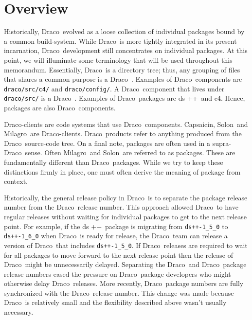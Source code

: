 \documentclass[11pt]{nmemo}
\newcommand{\draco}{{\normalfont\normalsize\sffamily Draco}}
\newcommand{\milagro}{{\normalfont\normalsize\sffamily Milagro}}
\newcommand{\solon}{{\normalfont\normalsize\sffamily Solon}}
\newcommand{\capsaicin}{{\normalfont\normalsize\sffamily Capsaicin}}
\newcommand{\cfour}{{\normalfont\normalsize\sffamily c\footnotesize 4}}
\newcommand{\dsxx}{{\normalfont\normalsize\sffamily ds\raisebox{.2ex}
  {\scriptsize ++}}}
\begin{document}

\section{Overview}
\label{sec:overview}

Historically, \draco\ evolved as a loose collection of individual
packages bound by a common build-system.  While \draco\ is more
tightly integrated in its present incarnation, \draco\ development
still concentrates on individual packages.  At this point, we will
illuminate some terminology that will be used throughout this
memorandum.  Essentially, \draco\ is a directory tree; thus, any
grouping of files that shares a common purpose is a \draco\ 
.  Examples of \draco\ components are
\texttt{draco/src/c4/} and \texttt{draco/config/}.  A \draco\ 
component that lives under \texttt{draco/src/} is a \draco\ 
.  Examples of \draco\ packages are \dsxx\ and \cfour.
Hence, packages are also \draco\ components.

\draco-clients are code systems that use \draco\ components.
\capsaicin, \solon\ and \milagro\ are \draco-clients.
\draco\ products refer to anything produced from the
\draco\ source-code tree.  On a final note, packages are often used in
a supra-\draco\ sense.  Often \milagro\ and \solon\ are referred to as
packages.  These are fundamentally different than \draco\ packages.
While we try to keep these distinctions firmly in place, one must
often derive the meaning of package from context.

Historically, the general release policy in \draco\ is to separate the
package release number from the \draco\ release number.  This approach
allowed \draco\ to have regular releases without waiting for
individual packages to get to the next release point.  For example, if
the \dsxx\ package is migrating from \texttt{ds++-1\_5\_0} to
\texttt{ds++-1\_6\_0} when \draco\ is ready for release, the
\draco\ team can release a version of \draco\ that includes
\texttt{ds++-1\_5\_0}.  If \draco\ releases are required to wait for
all packages to move forward to the next release point then the
release of \draco\ might be unnecessarily delayed.  Separating the
\draco\ and \draco\ package release numbers eased the pressure on
\draco\ package developers who might otherwise delay \draco\ releases.
More recently, \draco\ package numbers are fully synchronized with the
\draco\ release number.  This change was made because \draco\ is
relatively small and the flexibility described above wasn't usually
necessary.
\end{document}
